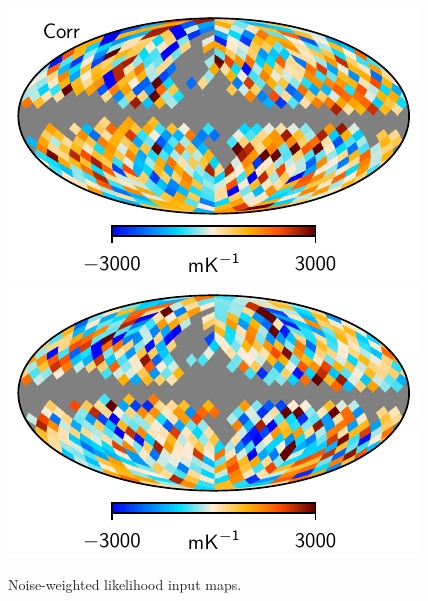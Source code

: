 \documentclass[twocolumn]{../../common/aa}
\begin{document}
\begin{figure}[t]
        \includegraphics[width=0.49\linewidth]{figures/wmap_reprod_tempcorr_KaQV_9yr_q_scale.pdf}
        \includegraphics[width=0.49\linewidth]{figures/wmap_reprod_tempcorr_KaQV_9yr_u_scale.pdf}
	\caption{Noise-weighted likelihood input maps.}
	\label{fig:likelihood_maps}
\end{figure}
\end{document}
